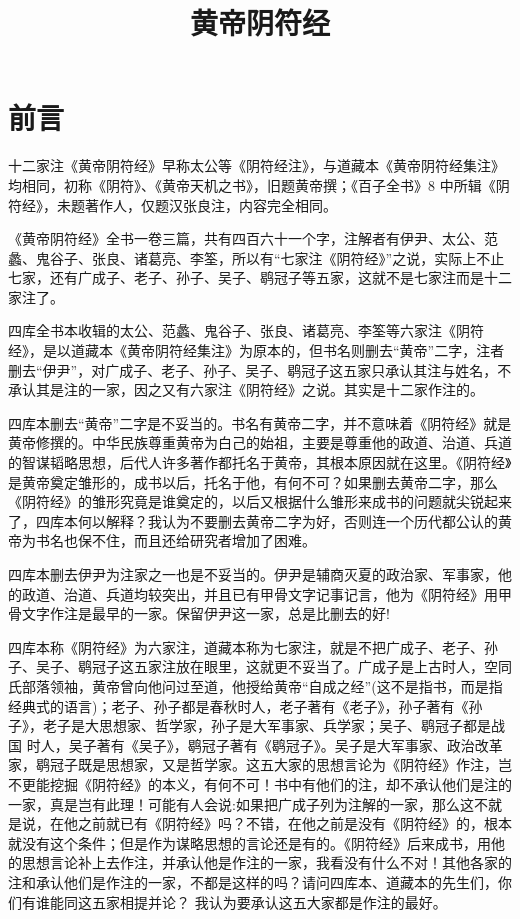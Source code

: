 \documentclass[12pt,UTF8]{ctexbook}
\title{\heiti\zihao{0} 黄帝阴符经}
\author{}
\date{}
\begin{document}
\maketitle
\tableofcontents

\frontmatter
\chapter{前言}

十二家注《黄帝阴符经》早称太公等《阴符经注》，与道藏本《黄帝阴符经集注》均相同，初称《阴符》、《黄帝天机之书》，旧题黄帝撰；《百子全书》8 中所辑《阴符经》，未题著作人，仅题汉张良注，内容完全相同。

《黄帝阴符经》全书一卷三篇，共有四百六十一个字，注解者有伊尹、太公、范蠡、鬼谷子、张良、诸葛亮、李筌，所以有“七家注《阴符经》”之说，实际上不止七家，还有广成子、老子、孙子、吴子、鹖冠子等五家，这就不是七家注而是十二家注了。

四库全书本收辑的太公、范蠡、鬼谷子、张良、诸葛亮、李筌等六家注《阴符经》，是以道藏本《黄帝阴符经集注》为原本的，但书名则删去“黄帝”二字，注者删去“伊尹”，对广成子、老子、孙子、吴子、鹖冠子这五家只承认其注与姓名，不承认其是注的一家，因之又有六家注《阴符经》之说。其实是十二家作注的。

四库本删去“黄帝”二字是不妥当的。书名有黄帝二字，并不意味着《阴符经》就是黄帝修撰的。中华民族尊重黄帝为白己的始祖，主要是尊重他的政道、治道、兵道的智谋韬略思想，后代人许多著作都托名于黄帝，其根本原因就在这里。《阴符经》是黄帝奠定雏形的，成书以后，托名于他，有何不可？如果删去黄帝二字，那么《阴符经》的雏形究竟是谁奠定的，以后又根据什么雏形来成书的问题就尖锐起来了，四库本何以解释？我认为不要删去黄帝二字为好，否则连一个历代都公认的黄帝为书名也保不住，而且还给研究者增加了困难。

四库本删去伊尹为注家之一也是不妥当的。伊尹是辅商灭夏的政治家、军事家，他的政道、治道、兵道均较突出，并且已有甲骨文字记事记言，他为《阴符经》用甲骨文字作注是最早的一家。保留伊尹这一家，总是比删去的好!

四库本称《阴符经》为六家注，道藏本称为七家注，就是不把广成子、老子、孙子、吴子、鹖冠子这五家注放在眼里，这就更不妥当了。广成子是上古时人，空同氏部落领袖，黄帝曾向他问过至道，他授给黄帝“自成之经”(这不是指书，而是指经典式的语言)；老子、孙子都是春秋时人，老子著有《老子》，孙子著有《孙子》，老子是大思想家、哲学家，孙子是大军事家、兵学家；吴子、鹖冠子都是战国
时人，吴子著有《吴子》，鹖冠子著有《鹖冠子》。吴子是大军事家、政治改革家，鹖冠子既是思想家，又是哲学家。这五大家的思想言论为《阴符经》作注，岂不更能挖掘《阴符经》的本义，有何不可！书中有他们的注，却不承认他们是注的一家，真是岂有此理！可能有人会说:如果把广成子列为注解的一家，那么这不就是说，在他之前就已有《阴符经》吗？不错，在他之前是没有《阴符经》的，根本就没有这个条件；但是作为谋略思想的言论还是有的。《阴符经》后来成书，用他的思想言论补上去作注，并承认他是作注的一家，我看没有什么不对！其他各家的注和承认他们是作注的一家，不都是这样的吗？请问四库本、道藏本的先生们，你们有谁能同这五家相提并论？
我认为要承认这五大家都是作注的最好。
\end{document}
